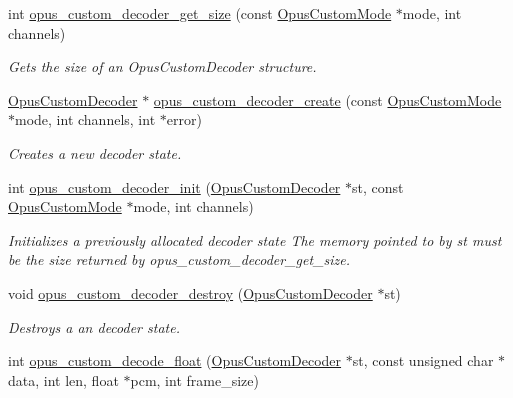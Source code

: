 \begin{DoxyCompactItemize}
int \hyperlink{group__opus__custom_gabe5d6f5f85dcad3ce8b88fe4b2642d2b}{opus\_\-custom\_\-decoder\_\-get\_\-size} (const \hyperlink{group__opus__custom_gaf33847c711195b9edef896b73c96ec4f}{OpusCustomMode} $\ast$mode, int channels)
\begin{DoxyCompactList}\small\item\em Gets the size of an OpusCustomDecoder structure. \item\end{DoxyCompactList}\item 
\hyperlink{group__opus__custom_gacae60f89c5ce7aeea69503451b9e2e6f}{OpusCustomDecoder} $\ast$ \hyperlink{group__opus__custom_ga16e5e655999536285638cac5e80673db}{opus\_\-custom\_\-decoder\_\-create} (const \hyperlink{group__opus__custom_gaf33847c711195b9edef896b73c96ec4f}{OpusCustomMode} $\ast$mode, int channels, int $\ast$error)
\begin{DoxyCompactList}\small\item\em Creates a new decoder state. \item\end{DoxyCompactList}\item 
int \hyperlink{group__opus__custom_gad4cb362035313c8f77c24cd29dd0932b}{opus\_\-custom\_\-decoder\_\-init} (\hyperlink{group__opus__custom_gacae60f89c5ce7aeea69503451b9e2e6f}{OpusCustomDecoder} $\ast$st, const \hyperlink{group__opus__custom_gaf33847c711195b9edef896b73c96ec4f}{OpusCustomMode} $\ast$mode, int channels)
\begin{DoxyCompactList}\small\item\em Initializes a previously allocated decoder state The memory pointed to by st must be the size returned by opus\_\-custom\_\-decoder\_\-get\_\-size. \item\end{DoxyCompactList}\item 
void \hyperlink{group__opus__custom_ga0e59e6389bd6478e9c3be48aff4459e1}{opus\_\-custom\_\-decoder\_\-destroy} (\hyperlink{group__opus__custom_gacae60f89c5ce7aeea69503451b9e2e6f}{OpusCustomDecoder} $\ast$st)
\begin{DoxyCompactList}\small\item\em Destroys a an decoder state. \item\end{DoxyCompactList}\item 
int \hyperlink{group__opus__custom_gac2c34002d4f546a535125e2780c81656}{opus\_\-custom\_\-decode\_\-float} (\hyperlink{group__opus__custom_gacae60f89c5ce7aeea69503451b9e2e6f}{OpusCustomDecoder} $\ast$st, const unsigned char $\ast$data, int len, float $\ast$pcm, int frame\_\-size)

\end{DoxyCompactItemize}
